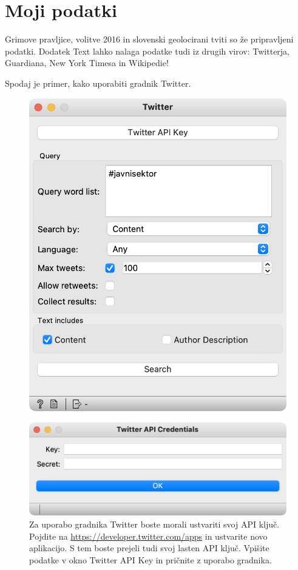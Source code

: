 \chapter{Moji podatki}
\label{ch:moji-podatki}

Grimove pravljice, volitve 2016 in slovenski geolocirani tviti so že pripravljeni podatki. Dodatek Text lahko nalaga podatke tudi iz drugih virov: Twitterja, Guardiana, New York Timesa in Wikipedie! 

Spodaj je primer, kako uporabiti gradnik Twitter.

\begin{figure}[h]
    \centering
    \includegraphics[width=0.65\linewidth]{twitter.png}%
    \caption{ }
    \label{fig:twitter}
\end{figure}

\begin{figure}[h]
    \centering
    \includegraphics[width=0.65\linewidth]{key-window.png}%
    \caption{Za uporabo gradnika Twitter boste morali ustvariti svoj API ključ. Pojdite na \url{https://developer.twitter.com/apps} in ustvarite novo aplikacijo. S tem boste prejeli tudi svoj lasten API ključ. Vpišite podatke v okno Twitter API Key in pričnite z uporabo gradnika.}
    \label{fig:twitter-key}
\end{figure}

